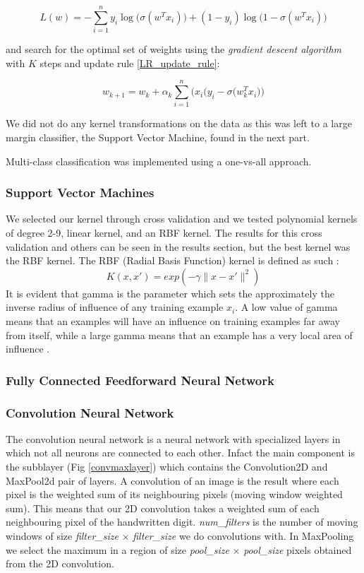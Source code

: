 \documentclass[conference]{IEEEtran}
\begin{document}
\begin{equation}
	\label{LL}
	L(w) = -\sum_{i=1}^n y_i\log\Big(\sigma(w^Tx_i)\Big) + (1-y_i)\log\Big(1-\sigma(w^Tx_i)\Big)
\end{equation}

and search for the optimal set of weights using the \emph{gradient descent algorithm} with $K$ steps and update rule \ref{LR_update_rule}:

\begin{equation}
\label{LR_update_rule}
	w_{k+1} = w_k + \alpha_k \sum_{i=1}^n \Big( x_i\big(y_i - \sigma(w_k^Tx_i\big) \Big)
\end{equation}

We did not do any kernel transformations on the data as this was left to a large margin classifier, the Support Vector Machine,  found in the next part.

Multi-class classification was implemented using a one-vs-all approach.

\subsubsection{Support Vector Machines}
We selected our kernel through cross validation and we tested polynomial kernels of degree 2-9, linear kernel, and an RBF kernel. The results for this cross validation and others can be seen in the results section, but the best kernel was the RBF kernel. The RBF (Radial Basis Function) kernel is defined as such \cite{Hastie}: \[K(x,x\prime )=exp(-\gamma\|x-x\prime \|^2)\] It is evident that gamma is the parameter which sets the approximately the inverse radius of influence of any training example $x_i$. A low value of gamma means that an examples will have an influence on training examples far away from itself, while a large gamma means that an example has a very local area of influence \cite{sklearn}.


\subsubsection{Fully Connected Feedforward Neural Network}

\subsubsection{Convolution Neural Network}
The convolution neural network \cite{LeCunn98} is a neural network with specialized layers in which not all neurons are connected to each other. Infact the main component is the subblayer (Fig \ref{convmaxlayer}) which contains the Convolution2D and MaxPool2d pair of layers. A convolution of an image is the result where each pixel is the weighted sum of its neighbouring pixels (moving window weighted sum). This means that our 2D convolution takes a weighted sum of each neighbouring pixel of the handwritten digit. \emph{num\_filters} is the number of moving windows of size \emph{filter\_size} $\times$ \emph{filter\_size} we do convolutions with. In MaxPooling we select the maximum in a region of size \emph{pool\_size} $\times$ \emph{pool\_size} pixels obtained from the 2D convolution.
\end{document}
